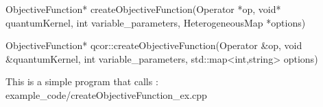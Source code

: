 
\begin{apidefinition}

\begin{Csynopsis}
    ObjectiveFunction* createObjectiveFunction(Operator *op, void* quantumKernel, int variable_parameters, HeterogeneousMap *options)
\end{Csynopsis}

\begin{Cppsynopsis}
    ObjectiveFunction* qcor::createObjectiveFunction(Operator &op, void &quantumKernel, int variable_parameters, std::map<int,string>  options)
\end{Cppsynopsis}


\begin{apiarguments}
\end{apiarguments}

\apidescription{
        
}

\apireturnvalues{
    
}      


\begin{apiexamples}

\apicppexample
    { This is a simple program that calls : } 
    { example_code/createObjectiveFunction_ex.cpp} 
    {}

\end{apiexamples}

\end{apidefinition}
